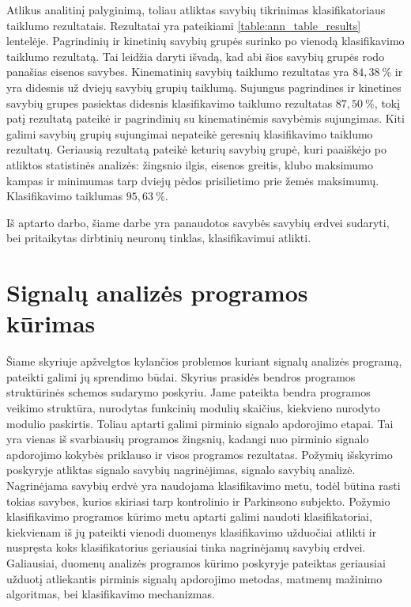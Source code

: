 \documentclass[]{vgtuef}
\begin{document}
Atlikus analitinį palyginimą, toliau atliktas savybių tikrinimas klasifikatoriaus taiklumo rezultatais. Rezultatai yra pateikiami \ref{table:ann_table_results} lentelėje. Pagrindinių ir kinetinių savybių grupės surinko po vienodą klasifikavimo taiklumo rezultatą. Tai leidžia daryti išvadą, kad abi šios savybių grupės rodo panašias eisenos savybes. Kinematinių savybių taiklumo rezultatas yra $84,38~\%$ ir yra didesnis už dviejų savybių grupių taiklumą. Sujungus pagrindines ir kinetines savybių grupes pasiektas didesnis klasifikavimo taiklumo rezultatas $87,50~\%$, tokį patį rezultatą pateikė ir pagrindinių su kinematinėmis savybėmis sujungimas. Kiti galimi savybių grupių sujungimai nepateikė geresnių klasifikavimo taiklumo rezultatų. Geriausią rezultatą pateikė keturių savybių grupė, kuri paaiškėjo po atliktos statistinės analizės: žingsnio ilgis, eisenos greitis, klubo maksimumo kampas ir minimumas tarp dviejų pėdos prisilietimo prie žemės maksimumų. Klasifikavimo taiklumas $95,63~\%$.

Iš aptarto darbo, šiame darbe yra panaudotos savybės savybių erdvei sudaryti, bei pritaikytas dirbtinių neuronų tinklas, klasifikavimui atlikti.

\section{Signalų analizės programos kūrimas}





Šiame skyriuje apžvelgtos kylančios problemos kuriant signalų analizės programą, pateikti galimi jų sprendimo būdai. Skyrius prasidės bendros programos struktūrinės schemos sudarymo poskyriu. Jame pateikta bendra programos veikimo struktūra, nurodytas funkcinių modulių skaičius, kiekvieno nurodyto modulio paskirtis. Toliau aptarti galimi pirminio signalo apdorojimo etapai. Tai yra vienas iš svarbiausių programos žingsnių, kadangi nuo pirminio signalo apdorojimo kokybės priklauso ir visos programos rezultatas. Požymių išskyrimo poskyryje atliktas signalo savybių nagrinėjimas, signalo savybių analizė. Nagrinėjama savybių erdvė yra naudojama klasifikavimo metu, todėl būtina rasti tokias savybes, kurios skiriasi tarp kontrolinio ir Parkinsono subjekto. Požymio klasifikavimo programos kūrimo metu aptarti galimi naudoti klasifikatoriai, kiekvienam iš jų pateikti vienodi duomenys klasifikavimo užduočiai atlikti ir nuspręsta koks klasifikatorius geriausiai tinka nagrinėjamų savybių erdvei. Galiausiai, duomenų analizės programos kūrimo poskyryje pateiktas geriausiai užduotį atliekantis pirminis signalų apdorojimo metodas, matmenų mažinimo algoritmas, bei klasifikavimo mechanizmas.
\end{document}
